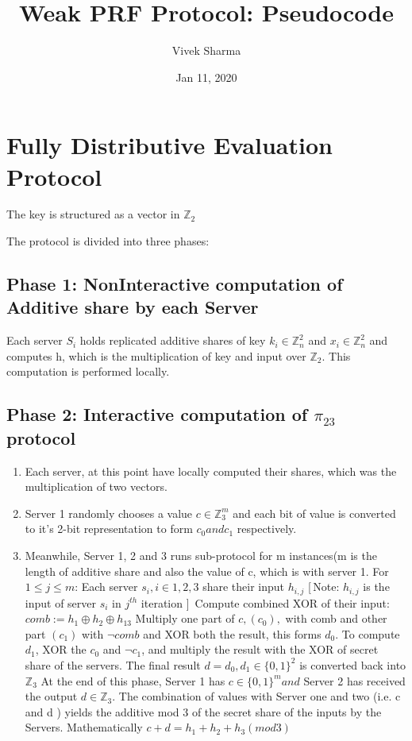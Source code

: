 \documentclass[11pt]{article}
\title{Weak PRF Protocol: Pseudocode}
\author{Vivek Sharma}
\date{Jan 11, 2020}
\begin{document}
\maketitle


\section{Fully Distributive Evaluation Protocol}
The key is structured as a vector in $\mathbb{Z}_2$


The protocol is divided into three phases:

\subsection{Phase 1: NonInteractive computation of Additive share by each Server} 
Each server $S_{i}$ holds replicated additive shares of key $k_{i} \in \mathbb{Z}_{n}^{2}$ and $x_{i} \in \mathbb{Z}_{n}^{2}$ and computes h, which is the multiplication of key and input over $\mathbb{Z}_2$. This computation is performed locally. 
\subsection{Phase 2: Interactive computation of $\pi_{23}$ protocol}

\begin{enumerate}
	\item Each server, at this point have locally computed their shares, which was the multiplication of two vectors.
	\item Server 1 randomly chooses a value $c \in \mathbb{Z}_{3}^{m}$ and each bit of value is converted to it's 2-bit representation to form $c_{0} and c_{1}$ respectively. 
	\item Meanwhile, Server 1, 2 and 3 runs sub-protocol for m instances(m is the length of additive share and also the value of c, which is with server 1.
	\subitem For $1 \leq j \leq m$:
	\subitem Each server $s_{i} , i \in {1,2,3}$ share their input $h_{i,j}$ [\,Note: $h_{i,j}$ is the input of server $s_{i}$ in $j^{th}$ iteration ]\,
	\subitem Compute combined XOR of their input: $comb := h_{1} \oplus h_{2} \oplus h_{13}$
	\subitem Multiply one part of $c,(c_{0}),$ with comb and other part $(c_{1})$ with $\neg{comb}$ and XOR both the result, this forms $d_{0}$.
	\subitem To compute $d_{1}$, XOR the $c_{0}$ and $\neg{c_{1}}$, and multiply the result with the XOR of secret share of the servers.
	\subitem The final result $d = d_{0}, d_{1} \in \{ 0,1\}^{2}$ is converted back into $\mathbb{Z}_{3}$
	\subitem At the end of this phase, Server 1 has $c \in \{0,1\}^m and $ Server 2 has received the output $d \in \mathbb{Z}_{3}$. The combination of values with Server one and two (i.e. c and d ) yields the additive mod 3 of the secret share of the inputs by the Servers. Mathematically $c + d = h_{1} + h_{2} + h_{3} (mod 3)$
\end{enumerate}
\end{document}
